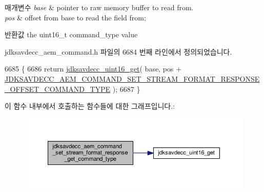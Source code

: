 \begin{DoxyParams}{매개변수}
{\em base} & pointer to raw memory buffer to read from. \\
\hline
{\em pos} & offset from base to read the field from; \\
\hline
\end{DoxyParams}
\begin{DoxyReturn}{반환값}
the uint16\+\_\+t command\+\_\+type value 
\end{DoxyReturn}


jdksavdecc\+\_\+aem\+\_\+command.\+h 파일의 6684 번째 라인에서 정의되었습니다.


\begin{DoxyCode}
6685 \{
6686     \textcolor{keywordflow}{return} \hyperlink{group__endian_ga3fbbbc20be954aa61e039872965b0dc9}{jdksavdecc\_uint16\_get}( base, pos + 
      \hyperlink{group__command__set__stream__format__response_gae76cbf087e2e7505bc3a4e455a4ece13}{JDKSAVDECC\_AEM\_COMMAND\_SET\_STREAM\_FORMAT\_RESPONSE\_OFFSET\_COMMAND\_TYPE}
       );
6687 \}
\end{DoxyCode}


이 함수 내부에서 호출하는 함수들에 대한 그래프입니다.\+:
\nopagebreak
\begin{figure}[H]
\begin{center}
\leavevmode
\includegraphics[width=350pt]{group__command__set__stream__format__response_ga3d5706b1635759023be9903b07a50141_cgraph}
\end{center}
\end{figure}


